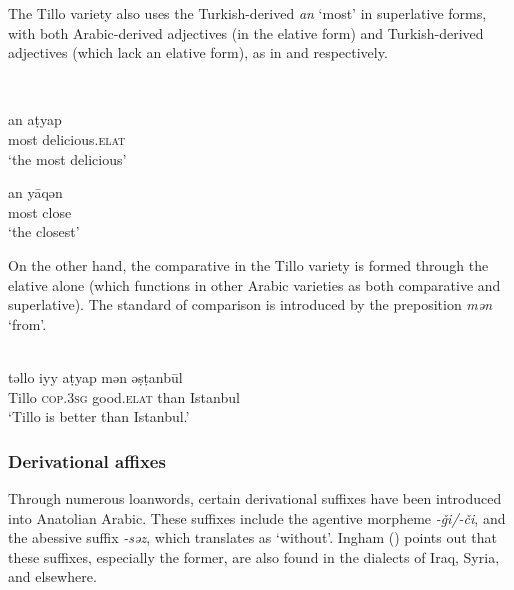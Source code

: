 \documentclass[output=paper]{langsci/langscibook}
\begin{document}
\noindent The Tillo variety also uses the Turkish-derived \textit{an} `most' in superlative forms, with both Arabic-derived adjectives (in the elative form) and Turkish-derived adjectives (which lack an elative form), as in  and  respectively.

\begin{exe}
\ex \label{adjt}\\
		\begin{xlist}
		\ex \label{adjt1}\gll an\footnotemark	 {} aṭyap\\
    most	delicious.\textsc{elat} \\
        \glt `the most delicious'


	\ex \label{adjt2} \gll an 	yāqən  \\
        most	close\\
        \glt `the closest'
		\end{xlist}
\end{exe}

\noindent  On the other hand, the comparative in the Tillo variety is formed through the elative alone (which functions in other Arabic varieties as both comparative and superlative). The standard of comparison is introduced by the preposition \textit{mən} `from'. 

\ea\label{adjt3} \\
\gll təllo 	iyy 		aṭyap mən 	ə\d{s}ṭanbūl\\  
     Tillo	\textsc{cop.3sg}	good.\textsc{elat}	than	Istanbul \\ 
\glt `Tillo is better than Istanbul.'
\z


\subsubsection{Derivational affixes}

Through numerous loanwords, certain derivational suffixes have been introduced into Anatolian Arabic. These suffixes include the agentive morpheme \textit{-\v{g}i/-\v{c}i}, and the abessive suffix \textit{-səz}, which translates as `without'. Ingham (\citeyear[178]{Ingham2011afg}) points out that these suffixes, especially the former, are also found in the dialects of Iraq, Syria, and elsewhere.
\end{document}
